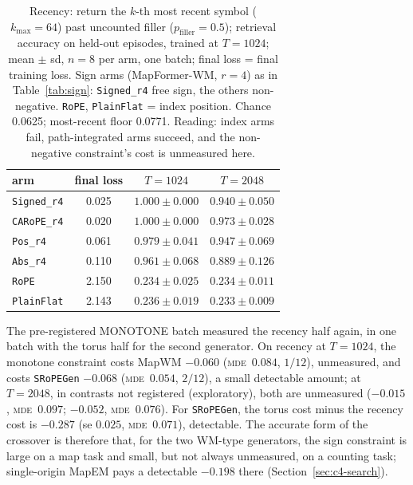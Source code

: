 \documentclass[10pt]{article}
\newcommand{\mde}{\textsc{mde}}
\newcommand{\arm}[1]{\texttt{#1}}
\begin{document}
\begin{table}[t]
\centering
\small
\captionsetup{font=footnotesize,skip=4pt}
\caption{Recency: return the $k$-th most recent symbol ($k_{\max}=64$) past uncounted filler ($p_{\mathrm{filler}}=0.5$); retrieval accuracy on held-out episodes, trained at $T=1024$; mean $\pm$ sd, $n=8$ per arm, one batch; final loss = final training loss. Sign arms (MapFormer-WM, $r=4$) as in Table~\ref{tab:sign}: \arm{Signed\_r4} free sign, the others non-negative. \arm{RoPE}, \arm{PlainFlat} = index position. Chance 0.0625; most-recent floor 0.0771. Reading: index arms fail, path-integrated arms succeed, and the non-negative constraint's cost is unmeasured here.}
\label{tab:recency}
\begin{tabular}{@{}lccc@{}}
\toprule
arm & final loss & $T=1024$ & $T=2048$ \\
\midrule
\arm{Signed\_r4}  & 0.025 & $1.000\pm0.000$ & $0.940\pm0.050$ \\
\arm{CARoPE\_r4}  & 0.020 & $1.000\pm0.000$ & $0.973\pm0.028$ \\
\arm{Pos\_r4}     & 0.061 & $0.979\pm0.041$ & $0.947\pm0.069$ \\
\arm{Abs\_r4}     & 0.110 & $0.961\pm0.068$ & $0.889\pm0.126$ \\
\arm{RoPE}        & 2.150 & $0.234\pm0.025$ & $0.234\pm0.011$ \\
\arm{PlainFlat}   & 2.143 & $0.236\pm0.019$ & $0.233\pm0.009$ \\
\bottomrule
\end{tabular}
\end{table}

The pre-registered MONOTONE batch measured the recency half again, in one batch with the torus half for
the second generator. On recency at $T=1024$, the monotone constraint costs MapWM $-0.060$ (\mde\
$0.084$, $1/12$), unmeasured, and costs \arm{SRoPEGen} $-0.068$ (\mde\ $0.054$, $2/12$), a small
detectable amount; at $T=2048$, in contrasts not registered (exploratory), both are unmeasured ($-0.015$, \mde\ $0.097$; $-0.052$, \mde\ $0.076$).
For \arm{SRoPEGen}, the torus cost minus the recency cost is $-0.287$ (se $0.025$, \mde\ $0.071$),
detectable. The accurate form of the crossover is therefore that, for the two WM-type generators, the sign
constraint is large on a map task and small, but not always unmeasured, on a counting task; single-origin MapEM
pays a detectable $-0.198$ there (Section~\ref{sec:c4-search}). %
\end{document}
